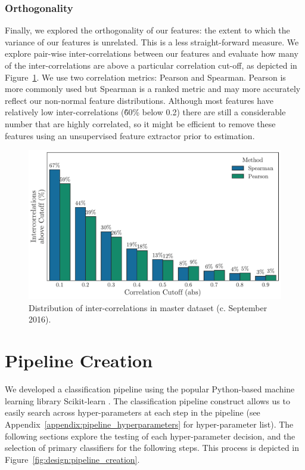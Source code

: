 \documentclass[../thesis/thesis.tex]{subfiles}
\begin{document}
\subsubsection{Orthogonality}

Finally, we explored the orthogonality of our features: the extent to which the variance of our features is unrelated. This is a less straight-forward measure. We explore pair-wise inter-correlations between our features and evaluate how many of the inter-correlations are above a particular correlation cut-off, as depicted in Figure~\ref{fig:design:orthogonality}. We use two correlation metrics: Pearson and Spearman. Pearson is more commonly used but Spearman is a ranked metric and may more accurately reflect our non-normal feature distributions. Although most features have relatively low inter-correlations (\~60\% below 0.2) there are still a considerable number that are highly correlated, so it might be efficient to remove these features using an unsupervised feature extractor prior to estimation.

\begin{figure}[!htb]
    \centering
    \includegraphics[width=\textwidth]{../figures/design/orthogonality}
    \caption[Distribution of inter-correlations]{Distribution of inter-correlations in master dataset (c. September 2016).}
    \label{fig:design:orthogonality}
\end{figure}

\section{Pipeline Creation}

We developed a classification pipeline using the popular Python-based machine learning library Scikit-learn \cite{pedregosa2011}. The classification pipeline construct allows us to easily search across hyper-parameters at each step in the pipeline (see Appendix~\ref{appendix:pipeline_hyperparameters} for hyper-parameter list). The following sections explore the testing of each hyper-parameter decision, and the selection of primary classifiers for the following steps. This process is depicted in Figure~\ref{fig:design:pipeline_creation}.
\end{document}
